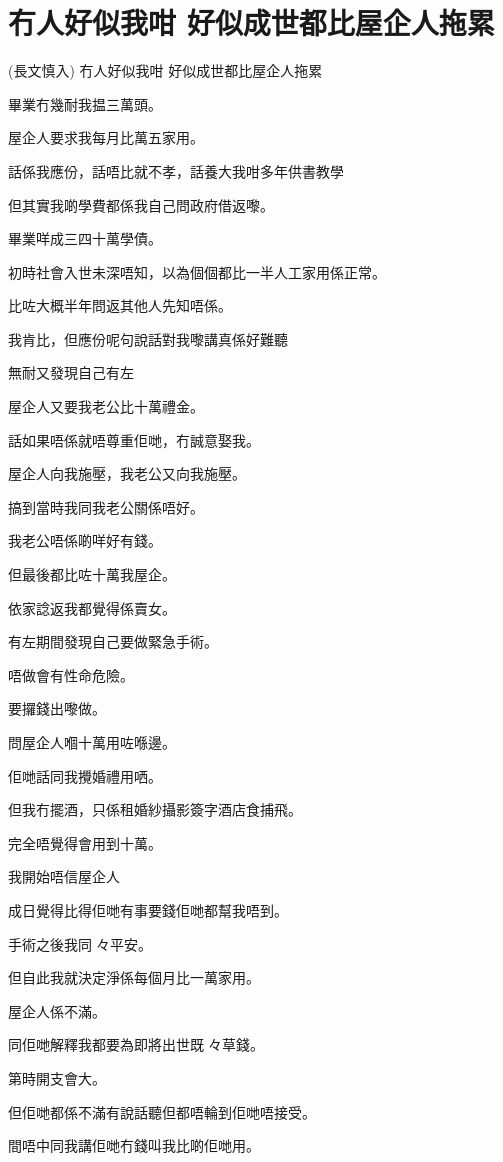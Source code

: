 \chapter{冇人好似我咁 好似成世都比屋企人拖累}

(長文慎入) 冇人好似我咁 好似成世都比屋企人拖累

畢業冇幾耐我揾三萬頭。

屋企人要求我每月比萬五家用。

話係我應份，話唔比就不孝，話養大我咁多年供書教學

但其實我啲學費都係我自己問政府借返嚟。

畢業咩成三四十萬學債。

初時社會入世未深唔知，以為個個都比一半人工家用係正常。

比咗大概半年問返其他人先知唔係。

我肯比，但應份呢句說話對我嚟講真係好難聽

無耐又發現自己有左

屋企人又要我老公比十萬禮金。

話如果唔係就唔尊重佢哋，冇誠意娶我。

屋企人向我施壓，我老公又向我施壓。

搞到當時我同我老公關係唔好。

我老公唔係啲咩好有錢。

但最後都比咗十萬我屋企。

依家諗返我都覺得係賣女。

有左期間發現自己要做緊急手術。

唔做會有性命危險。

要攞錢出嚟做。

問屋企人嗰十萬用咗喺邊。

佢哋話同我攪婚禮用哂。

但我冇擺酒，只係租婚紗攝影簽字酒店食捕飛。

完全唔覺得會用到十萬。

我開始唔信屋企人

成日覺得比得佢哋有事要錢佢哋都幫我唔到。

手術之後我同々平安。

但自此我就決定淨係每個月比一萬家用。

屋企人係不滿。

同佢哋解釋我都要為即將出世既々草錢。

第時開支會大。

但佢哋都係不滿有說話聽但都唔輪到佢哋唔接受。

間唔中同我講佢哋冇錢叫我比啲佢哋用。

